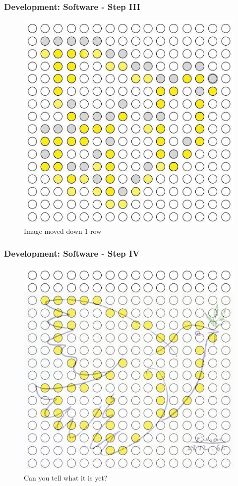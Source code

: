 \documentclass{beamer}
\begin{document}
\begin{frame}
\frametitle{Development: Software - Step III}

\begin{figure}
	\includegraphics[scale=0.4]{images/example_3.jpg}
	\caption{Image moved down 1 row}
\end{figure}

\end{frame}

\begin{frame}
\frametitle{Development: Software - Step IV}

\begin{figure}
	\includegraphics[scale=0.4]{images/example_final.jpg}
	\caption{Can you tell what it is yet?}
\end{figure}

\end{frame}
\end{document}
